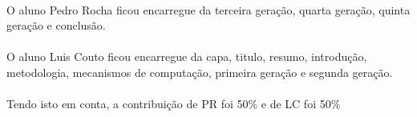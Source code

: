 \documentclass{report}
\begin{document}
\paragraph{}
O aluno Pedro Rocha ficou encarregue da terceira geração, quarta geração, quinta geração e conclusão.
\paragraph{}
O aluno Luis Couto ficou encarregue da capa, titulo, resumo, introdução, metodologia, mecanismos de computação, primeira geração e segunda geração.
\paragraph{}
Tendo isto em conta, a contribuição de PR foi 50\% e de LC foi 50\%
 


\printbibliography
\end{document}
